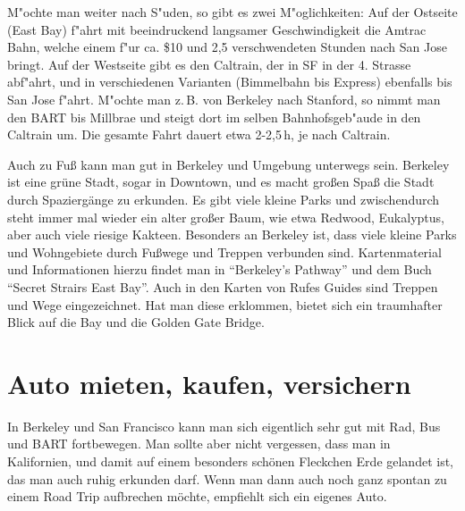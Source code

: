 \documentclass[a4paper]{scrreprt}
\begin{document}
M"ochte man weiter nach S"uden, so gibt es zwei M"oglichkeiten: Auf der Ostseite (East Bay) f"ahrt mit beeindruckend langsamer Geschwindigkeit die Amtrac Bahn, welche einem f"ur ca. \$10 und 2,5 verschwendeten Stunden nach San Jose bringt.
Auf der Westseite gibt es den Caltrain, der in SF in der 4. Strasse abf"ahrt, und in verschiedenen Varianten (Bimmelbahn bis Express) ebenfalls bis San Jose f"ahrt.
M"ochte man z.\,B. von Berkeley nach Stanford, so nimmt man den BART bis Millbrae und steigt dort im selben Bahnhofsgeb"aude in den Caltrain um.
Die gesamte Fahrt dauert etwa 2-2,5\,h, je nach Caltrain.

Auch zu Fuß kann man gut in Berkeley und Umgebung unterwegs sein. 
Berkeley ist eine grüne Stadt, sogar in Downtown, und es macht großen Spaß die Stadt durch Spaziergänge zu erkunden. 
Es gibt viele kleine Parks und zwischendurch steht immer mal wieder ein alter großer Baum, wie etwa Redwood, Eukalyptus, aber auch viele riesige Kakteen. 
Besonders an Berkeley ist, dass viele kleine Parks und Wohngebiete durch Fußwege und Treppen verbunden sind. 
Kartenmaterial und Informationen hierzu findet man in ``Berkeley's Pathway'' und dem Buch ``Secret Strairs East Bay''. 
Auch in den Karten von Rufes Guides sind Treppen und Wege eingezeichnet. 
Hat man diese erklommen, bietet sich ein traumhafter Blick auf die Bay und die Golden Gate Bridge.

\section{Auto mieten, kaufen, versichern}

In Berkeley und San Francisco kann man sich eigentlich sehr gut mit Rad, Bus und BART fortbewegen. 
Man sollte aber nicht vergessen, dass man in Kalifornien, und damit auf einem besonders schönen Fleckchen Erde gelandet ist, das man auch ruhig erkunden darf. 
Wenn man dann auch noch ganz spontan zu einem Road Trip aufbrechen möchte, empfiehlt sich ein eigenes Auto.
\end{document}
